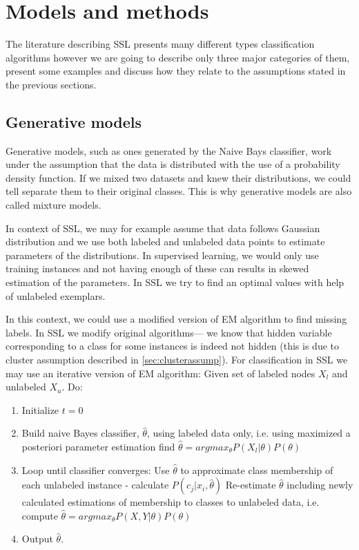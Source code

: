 \documentclass[12pt, a4paper, pdflatex]{report}
\begin{document}
\section{Models and methods}

The literature describing SSL presents many different types classification algorithms\cite{chapelle06,Zhu06semi} however we are going to describe only three major categories of them, present some examples and discuss how they relate to the assumptions stated in the previous sections.

\subsection{Generative models}

Generative models, such as ones generated by the Naive Bays classifier, work under the assumption that the data is distributed with the use of a probability density function. If we mixed two datasets and knew their distributions, we could tell separate them to their original classes. This is why generative models are also called mixture models\cite{Zhu06semi}.

In context of SSL, we may for example assume that data follows Gaussian distribution and we use both labeled and unlabeled data points to estimate parameters of the distributions. In supervised learning, we would only use training instances and not having enough of these can results in skewed estimation of the parameters. In SSL we try to find an optimal values with help of unlabeled exemplars.

In this context, we could use a modified version of EM algorithm to find missing labels. In SSL we modify original algorithms--- we know that hidden variable corresponding to a class for some instances is indeed not hidden (this is due to cluster assumption described in \ref{sec:clusterassump})\cite{Zhu06semi, chapelle06}. For classification in SSL we may use an iterative version of EM algorithm:
\newline
Given set of labeled nodes $X_l$ and unlabeled $X_u$. Do:
\newline
\begin{enumerate}
\item Initialize $t  = 0 $
\item Build naive Bayes classifier, $ \hat{\theta}$, using labeled data only, i.e. using maximized a posteriori parameter estimation find $ \hat{\theta} = argmax_{\theta} P(X_{l} | \theta)P(\theta) $
\item Loop until classifier converges:
\subitem Use $\hat{\theta}$ to approximate class membership of each unlabeled instance - calculate $ P(c_j|x_i, \hat{\theta})$
\subitem Re-estimate $\hat{\theta}$ including newly calculated estimations of membership to classes to unlabeled data, i.e. compute $ \hat{\theta} = argmax_{\theta} P(X, Y | \theta)P(\theta) $
\item Output $\hat{\theta}$.

\end{enumerate}
\end{document}
